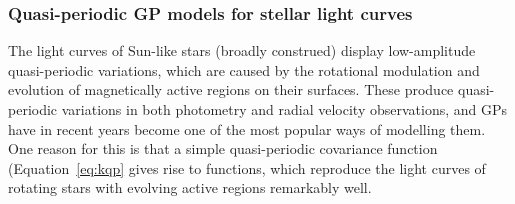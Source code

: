 \documentclass[letterpaper]{ar-1col}
\newcommand{\suz}[1]{\textcolor{magenta}{#1}}
\begin{document}
\subsubsection{Quasi-periodic GP models for stellar light curves}

The light curves of Sun-like stars (broadly construed) display low-amplitude quasi-periodic variations, which are caused by the rotational modulation and evolution of magnetically active regions on their surfaces. These produce quasi-periodic variations in both photometry and radial velocity observations, and GPs have in recent years become one of the most popular ways of modelling them. One reason for this is that a simple quasi-periodic covariance function (Equation~\ref{eq:kqp} gives rise to functions, which reproduce the light curves of rotating stars with evolving active regions remarkably well.

\end{document}
